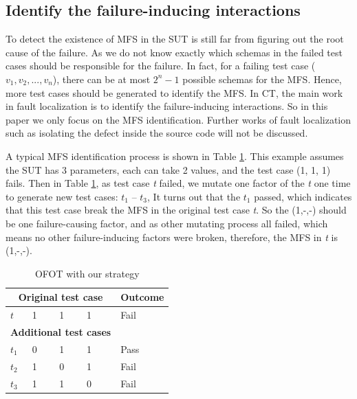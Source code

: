 \documentclass{sig-alternate}
\begin{document}
%

%
%
%


\subsection{Identify the failure-inducing interactions}
To detect the existence of MFS in the SUT is still far from figuring out the root cause of the failure. As we do not know exactly which schemas in the failed test cases should be responsible for the failure. In fact, for a failing test case ($v_{1},v_{2},...,v_{n}$), there can be at most $2^{n} - 1$ possible schemas for the MFS. Hence, more test cases should be generated to identify the MFS. In CT, the main work in fault localization is to identify the failure-inducing interactions. So in this paper we only focus on the MFS identification. Further works of fault localization such as isolating the defect inside the source code will not be discussed.

A typical MFS identification process is shown in Table \ref{ofot-identify}. This example assumes the SUT has 3 parameters, each can take 2 values, and the test case (1, 1, 1) fails. Then in Table \ref{ofot-identify}, as test case \emph{t} failed, we mutate one factor of the \emph{t} one time to generate new test cases: $t_{1}$ -- $t_{3}$, It turns out that the $t_{1}$ passed, which indicates that this test case break the MFS in the original test case \emph{t}. So the (1,-,-) should be one failure-causing factor, and as other mutating process all failed, which means no other failure-inducing factors were broken, therefore, the MFS in \emph{t} is (1,-,-).

\begin{table}[h]
\caption{OFOT with our strategy}
\label{ofot-identify}
\center
\begin{tabular}{llllll}
 \hline
\multicolumn{5}{c}{\bfseries Original test case} & \bfseries Outcome \\  \hline
 $t$ & \multicolumn{4}{l}{1 \ \ \ \ 1 \ \ \ \  1 } & Fail \\
 \hline
\multicolumn{5}{c}{\bfseries Additional  test cases} &  \\  \hline
$t_{1}$ &\multicolumn{4}{l}{0  \ \ \ \  1 \ \ \ \  1 }& Pass \\
$t_{2}$ &\multicolumn{4}{l}{1  \ \ \ \  0 \ \ \ \  1 } & Fail \\
$t_{3}$ &\multicolumn{4}{l}{1  \ \ \ \  1 \ \ \ \  0 } & Fail \\
 \hline
\end{tabular}
\end{table}
\end{document}
